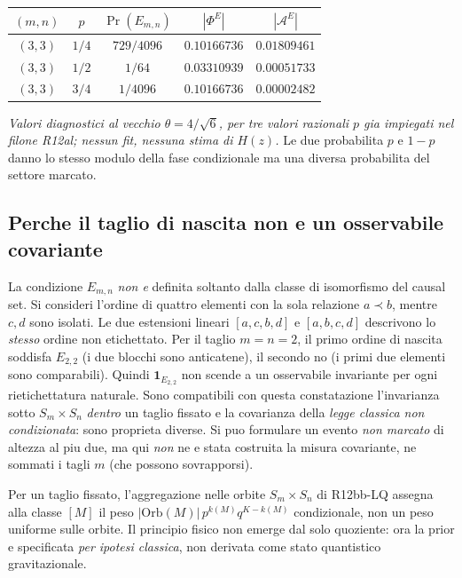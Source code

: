 \documentclass[11pt,a4paper]{article}
\begin{document}
\begin{center}
\small
\begin{tabular}{ccccc}
\toprule
$(m,n)$ & $p$ & $\Pr(E_{m,n})$ & $|\Phi^E|$ & $|\mathcal A^E|$\\
\midrule
$(3,3)$ & $1/4$ & $729/4096$ & $0.10166736$ & $0.01809461$\\
$(3,3)$ & $1/2$ & $1/64$ & $0.03310939$ & $0.00051733$\\
$(3,3)$ & $3/4$ & $1/4096$ & $0.10166736$ & $0.00002482$\\
\bottomrule
\end{tabular}
\end{center}
\textit{Valori diagnostici al vecchio $\theta=4/\sqrt6$, per tre valori razionali $p$ gia impiegati nel filone R12al; nessun fit, nessuna stima di $H(z)$.} Le due probabilita $p$ e $1-p$ danno lo stesso modulo della fase condizionale ma una diversa probabilita del settore marcato.

\subsection*{Perche il taglio di nascita non e un osservabile covariante}
La condizione $E_{m,n}$ \emph{non e} definita soltanto dalla classe di isomorfismo del causal set. Si consideri l'ordine di quattro elementi con la sola relazione $a\prec b$, mentre $c,d$ sono isolati. Le due estensioni lineari $[a,c,b,d]$ e $[a,b,c,d]$ descrivono lo \emph{stesso} ordine non etichettato. Per il taglio $m=n=2$, il primo ordine di nascita soddisfa $E_{2,2}$ (i due blocchi sono anticatene), il secondo no (i primi due elementi sono comparabili). Quindi $\mathbf1_{E_{2,2}}$ non scende a un osservabile invariante per ogni rietichettatura naturale. Sono compatibili con questa constatazione l'invarianza sotto $S_m\times S_n$ \emph{dentro} un taglio fissato e la covarianza della \emph{legge classica non condizionata}: sono proprieta diverse. Si puo formulare un evento \emph{non marcato} di altezza al piu due, ma qui \emph{non} ne e stata costruita la misura covariante, ne sommati i tagli $m$ (che possono sovrapporsi).

Per un taglio fissato, l'aggregazione nelle orbite $S_m\times S_n$ di R12bb-LQ assegna alla classe $[M]$ il peso $|\mathrm{Orb}(M)|\,p^{k(M)}q^{K-k(M)}$ condizionale, non un peso uniforme sulle orbite. Il principio fisico non emerge dal solo quoziente: ora la prior e specificata \emph{per ipotesi classica}, non derivata come stato quantistico gravitazionale.
\end{document}
